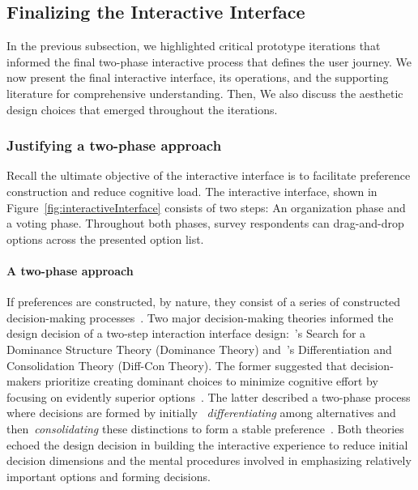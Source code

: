 \subsection{Finalizing the Interactive Interface}
\label{sec:finalInterfaceDesign}
In the previous subsection, we highlighted critical prototype iterations that informed the final two-phase interactive process that defines the user journey. 
We now present the final interactive interface, its operations, and the supporting literature for comprehensive understanding.
Then, We also discuss the aesthetic design choices that emerged throughout the iterations.

\subsubsection{Justifying a two-phase approach}
Recall the ultimate objective of the interactive interface is to facilitate preference construction and reduce cognitive load. The interactive interface, shown in Figure~\ref{fig:interactiveInterface} consists of two steps: An organization phase and a voting phase. Throughout both phases, survey respondents can drag-and-drop options across the presented option list.

\paragraph{A two-phase approach}
If preferences are constructed, by nature, they consist of a series of constructed decision-making processes~\cite{lichtensteinConstructionPreference2006}. Two major decision-making theories informed the design decision of a two-step interaction interface design:~\textcite{montgomeryDecisionRulesSearch1983}'s Search for a Dominance Structure Theory (Dominance Theory) and~\textcite{svensonDifferentiationConsolidationTheory1992}'s Differentiation and Consolidation Theory (Diff-Con Theory). The former suggested that decision-makers prioritize creating dominant choices to minimize cognitive effort by focusing on evidently superior options~\cite{montgomeryDecisionRulesSearch1983}. The latter described a two-phase process where decisions are formed by initially ~\textit{differentiating} among alternatives and then~\textit{consolidating} these distinctions to form a stable preference~\cite{svensonDifferentiationConsolidationTheory1992}. Both theories echoed the design decision in building the interactive experience to reduce initial decision dimensions and the mental procedures involved in emphasizing relatively important options and forming decisions.

